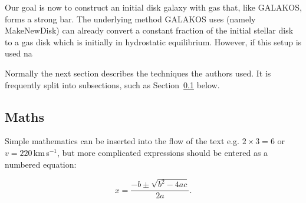 \documentclass[a4paper,fleqn,usenatbib]{mnras}
\begin{document}
Our goal is now to construct an initial disk galaxy with gas that, like
GALAKOS, forms a strong bar. The underlying method GALAKOS uses (namely
MakeNewDisk) can already convert a constant fraction of the initial stellar disk to a
gas disk which is initially in hydrostatic equilibrium. However, if this setup
is used na





Normally the next section describes the techniques the authors used.
It is frequently split into subsections, such as Section~\ref{sec:maths} below.

\subsection{Maths}
\label{sec:maths} %

Simple mathematics can be inserted into the flow of the text e.g. $2\times3=6$
or $v=220$\,km\,s$^{-1}$, but more complicated expressions should be entered
as a numbered equation:

\begin{equation}
    x=\frac{-b\pm\sqrt{b^2-4ac}}{2a}.
	\label{eq:quadratic}
\end{equation}
\end{document}
